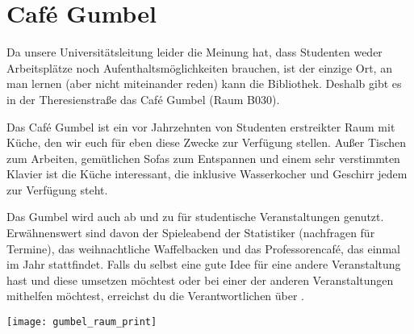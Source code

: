﻿
\chapter{Café Gumbel}

Da unsere Universitätsleitung leider die Meinung hat, dass Studenten weder Arbeitsplätze noch Aufenthaltsmöglichkeiten brauchen, ist der einzige Ort, an man lernen (aber nicht miteinander reden) kann die Bibliothek. Deshalb gibt es in der Theresienstraße das Café Gumbel (Raum B030).

Das Café Gumbel ist ein vor Jahrzehnten von Studenten erstreikter Raum mit Küche, den wir euch für eben diese Zwecke zur Verfügung stellen. Außer Tischen zum Arbeiten, gemütlichen Sofas zum Entspannen und einem sehr verstimmten Klavier ist die Küche interessant, die inklusive Wasserkocher und Geschirr jedem zur Verfügung steht.

Das Gumbel wird auch ab und zu für studentische Veranstaltungen genutzt. Erwähnenswert sind davon der Spieleabend der Statistiker (nachfragen für Termine), das weihnachtliche Waffelbacken und das Professorencafé, das einmal im Jahr stattfindet.
Falls du selbst eine gute Idee für eine andere Veranstaltung hast und diese umsetzen möchtest oder bei einer der anderen Veranstaltungen mithelfen möchtest, erreichst du die Verantwortlichen über .

\skiptobottom
\texttt{[image: gumbel\_raum\_print]}
